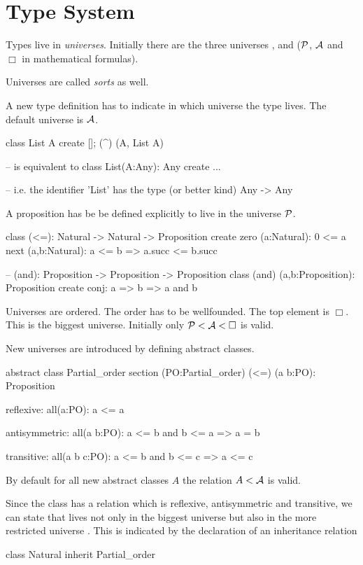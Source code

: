 \section{Type System}

Types live in \emph{universes}. Initially there are the three universes
,  and  (${\cal{P}}$, ${\cal{A}}$ and $\Box$ in
mathematical formulas).

Universes are called \emph{sorts} as well.

A new type definition has to indicate in which universe the type lives. The
default universe is ${\cal{A}}$.

\begin{alba}
  class List A create [];  (^) (A, List A)

  -- is equivalent to
  class List(A:Any): Any create ...

  -- i.e. the identifier 'List' has the type (or better kind)
  Any -> Any
\end{alba}

A proposition has be be defined explicitly to live in the universe ${\cal{P}}$.
%
\begin{alba}
  class
    (<=): Natural -> Natural -> Proposition
  create
    zero (a:Natural): 0 <= a
    next (a,b:Natural): a <= b => a.succ <= b.succ

  -- (and): Proposition -> Proposition -> Proposition
  class
    (and) (a,b:Proposition): Proposition
  create
    conj: a => b => a and b
\end{alba}

Universes are ordered. The order has to be wellfounded. The top element is
$\Box$. This is the biggest universe. Initially only ${\cal{P}} < {\cal{A}} < \Box$ is
valid.

New universes are introduced by defining abstract classes.
\begin{alba}
  abstract
    class Partial_order
  section (PO:Partial_order)
    (<=) (a b:PO): Proposition

    reflexive:
      all(a:PO): a <= a

    antisymmetric:
      all(a b:PO):
        a <= b  and  b <= a
        =>  a = b

    transitive:
      all(a b c:PO):
        a <= b and b <= c
        => a <= c
\end{alba}
%
By default for all new abstract classes $A$ the relation $A < {\cal{A}}$ is
valid.

Since the class  has a relation \code{<=} which is reflexive,
antisymmetric and transitive, we can state that  lives not only
in the biggest universe  but also in the more restricted universe
. This is indicated by the declaration of an
inheritance relation
%
\begin{alba}
  class Natural inherit Partial_order
\end{alba}

